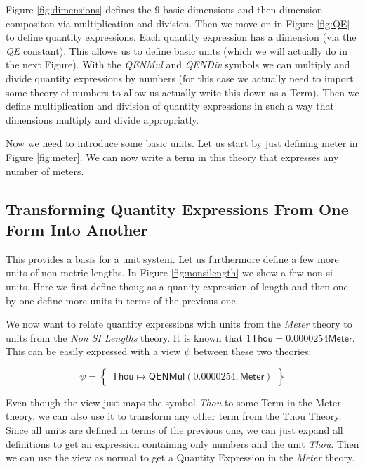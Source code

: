 

Figure \ref{fig:dimensions} defines the 9 basic dimensions and then dimension compositon via multiplication and division. Then we move on in Figure \ref{fig:QE} to define quantity expressions. Each quantity expression has a dimension (via the \textit{QE} constant). This allows us to define basic units (which we will actually do in the next Figure). With the \textit{QENMul} and \textit{QENDiv} symbols we can multiply and divide quantity expressions by numbers (for this case we actually need to import some theory of numbers to allow us actually write this down as a Term). Then we define multiplication and division of quantity expressions in such a way that dimensions multiply and divide appropriatly.

Now we need to introduce some basic units. Let us start by just defining meter in Figure \ref{fig:meter}. We can now write a term in this theory that expresses any number of meters.



\subsection{Transforming Quantity Expressions From One Form Into Another}
\label{sec:qeconv}

This provides a basis for a unit system. Let us furthermore define a few more units of non-metric lengths. In Figure \ref{fig:nonsilength} we show a few non-si units. Here we first define thoug as a quanity expression of length and then one-by-one define more units in terms of the previous one.


We now want to relate quantity expressions with units from the \textit{Meter} theory to units from the \textit{Non SI Lengths} theory. It is known that $1 \mathsf{Thou} = 0.0000254 \mathsf{Meter}$. This can be easily expressed with a view $\psi$ between these two theories:

\[
\psi = \left\{\begin{array}{l}
  \mathsf{Thou} \mapsto \mathsf{QENMul} \left( 0.0000254, \mathsf{Meter} \right)
\end{array}\right\}
\]

Even though the view just maps the symbol \textit{Thou} to some Term in the Meter theory, we can also use it to transform any other term from the Thou Theory. Since all units are defined in terms of the previous one, we can just expand all definitions to get an expression containing only numbers and the unit \textit{Thou}. Then we can use the view as normal to get a Quantity Expression in the \textit{Meter} theory.
